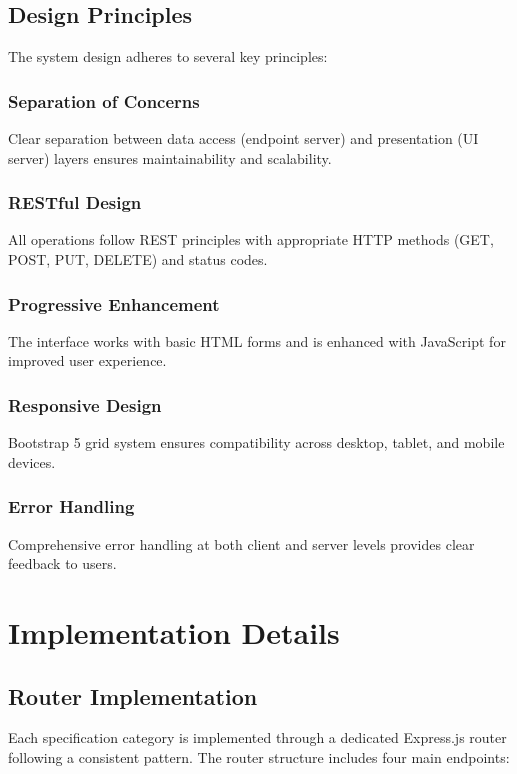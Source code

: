 \documentclass[11pt,a4paper]{article}
\begin{document}
\subsection{Design Principles}

The system design adheres to several key principles:

\subsubsection{Separation of Concerns}
Clear separation between data access (endpoint server) and presentation (UI server) layers ensures maintainability and scalability.

\subsubsection{RESTful Design}
All operations follow REST principles with appropriate HTTP methods (GET, POST, PUT, DELETE) and status codes.

\subsubsection{Progressive Enhancement}
The interface works with basic HTML forms and is enhanced with JavaScript for improved user experience.

\subsubsection{Responsive Design}
Bootstrap 5 grid system ensures compatibility across desktop, tablet, and mobile devices.

\subsubsection{Error Handling}
Comprehensive error handling at both client and server levels provides clear feedback to users.

\section{Implementation Details}

\subsection{Router Implementation}

Each specification category is implemented through a dedicated Express.js router following a consistent pattern. The router structure includes four main endpoints:
\end{document}
